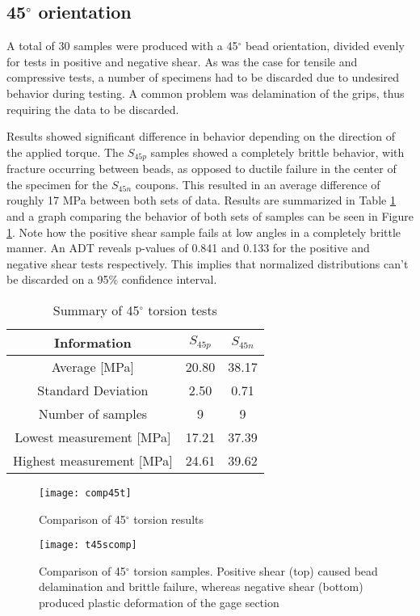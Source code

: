 \documentclass[main.tex]{subfiles}
\begin{document}
\subsection{45$^\circ$ orientation} \label{ssec:45r}
A total of 30 samples were produced with a 45$^\circ$ bead orientation, divided evenly for tests in positive and negative shear. As was the case for tensile and compressive tests, a number of specimens had to be discarded due to undesired behavior during testing. A common problem was delamination of the grips, thus requiring the data to be discarded. 

Results showed significant difference in behavior depending on the direction of the applied torque. The $S_{45p}$ samples showed a completely brittle behavior, with fracture occurring between beads, as opposed to ductile failure in the center of the specimen for the $S_{45n}$ coupons. This resulted in an average difference of roughly 17 MPa between both sets of data. Results are summarized in Table \ref{tab:tors45r} and a graph comparing the behavior of both sets of samples can be seen in Figure \ref{fig:45comp}. Note how the positive shear sample fails at low angles in a completely brittle manner. An ADT reveals p-values of 0.841 and 0.133 for the positive and negative shear tests respectively. This implies that normalized distributions can't be discarded on a 95\% confidence interval. 

\begin{table} [h]
	\centering
	\caption{Summary of 45$^\circ$ torsion tests}
\begin{tabular}{ c| c c } 
	\toprule
	\textbf{Information} & $S_{45p}$ & $S_{45n}$\\
	\midrule
	Average [MPa] & 20.80 & 38.17\\
	Standard Deviation & 2.50 & 0.71\\
	Number of samples & 9 & 9\\
	Lowest measurement [MPa] &17.21  & 37.39\\
	Highest measurement [MPa] &24.61 & 39.62\\
	\bottomrule
\end{tabular}
\label{tab:tors45r}
\end{table}

\begin{figure}[!htbp]
	\center
	\texttt{[image: comp45t]}
	\caption{Comparison of 45$^\circ$ torsion results} \label{fig:45comp}
\end{figure}

\begin{figure}[!htbp]
	\center
	\texttt{[image: t45scomp]}
	\captionsetup{justification=centering} %
	\caption[Comparison of 45$^\circ$ torsion results]{Comparison of 45$^\circ$ torsion samples. Positive shear (top) caused bead delamination and brittle failure, whereas negative shear (bottom) produced plastic deformation of the gage section} \label{fig:45scomp}
\end{figure}
  
\end{document}

